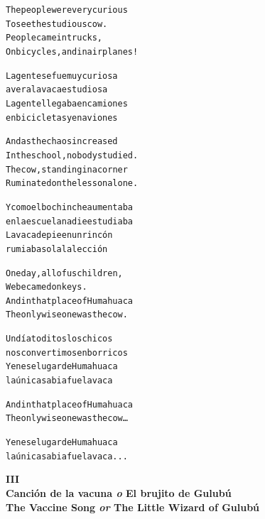 \documentclass[11pt,a4paper]{article}
\begin{document}
\begin{parcolumns}{2}
\colchunk
{
\begin{alltt}\normalfont
The people were very curious
To see the studious cow.
People came in trucks,
On bicycles, and in airplanes!
\end{alltt}
}

\colchunk
{
\begin{alltt}\normalfont
La gente se fue muy curiosa
a ver a la vaca estudiosa
La gente llegaba en camiones
en bicicletas y en aviones
\end{alltt}
}

\colplacechunks

\colchunk
{
\begin{alltt}\normalfont
And as the chaos increased
In the school, nobody studied.
The cow, standing in a corner
Ruminated on the lesson alone.
\end{alltt}
}

\colchunk
{
\begin{alltt}\normalfont
Y como el bochinche aumentaba
en la escuela nadie estudiaba
La vaca de pie en un rincón
rumiaba sola la lección
\end{alltt}
}

\colplacechunks

\colchunk
{
\begin{alltt}\normalfont
One day, all of us children,
We became donkeys.
And in that place of Humahuaca
The only wise one was the cow.
\end{alltt}
}

\colchunk
{
\begin{alltt}\normalfont
Un día toditos los chicos
nos convertimos en borricos
Y en ese lugar de Humahuaca
la única sabia fue la vaca
\end{alltt}
}

\colplacechunks

\colchunk
{
\begin{alltt}\normalfont
And in that place of Humahuaca
The only wise one was the cow…
\end{alltt}
}

\colchunk
{
\begin{alltt}\normalfont
Y en ese lugar de Humahuaca
la única sabia fue la vaca...
\end{alltt}
}

\colplacechunks

\end{parcolumns}

\clearpage

\begin{center}
\large\textbf{
III\\
Canción de la vacuna \emph{o} El brujito de Gulubú\\
The Vaccine Song \emph{or} The Little Wizard of Gulubú
}
\end{center}
\end{document}
